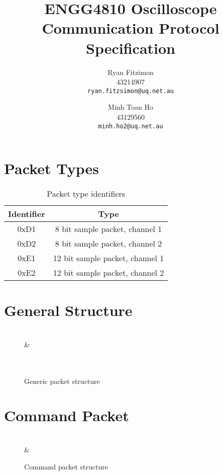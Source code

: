 \documentclass[]{article}
\title{ENGG4810 Oscilloscope Communication Protocol Specification}
\author{
	Ryan Fitzimon\\
	43214907\\
	\texttt{ryan.fitzsimon@uq.net.au}
	\and
	Minh Toan Ho\\
	43129560\\
	\texttt{minh.ho2@uq.net.au}
}
\begin{document}
\maketitle

\section{Packet Types}
\begin{table}[H]
	\centering
	\begin{tabular}{|c|c|}
		\hline
		\textbf{Identifier} & \textbf{Type} \\ \hline
		0xD1 & 8 bit sample packet, channel 1 \\ \hline
		0xD2 & 8 bit sample packet, channel 2 \\ \hline
		0xE1 & 12 bit sample packet, channel 1 \\ \hline
		0xE2 & 12 bit sample packet, channel 2 \\ \hline
	\end{tabular}
	\caption{Packet type identifiers}
\end{table}

\section{General Structure}
\begin{figure}[H]
	\centering
	\begin{bytefield}[bitwidth=2em]{16}
		 \\
		 &  \\
		 \\
		 \\
	\end{bytefield}
	\caption{Generic packet structure}
\end{figure}

\section{Command Packet}
\begin{figure}[H]
	\centering
	\begin{bytefield}[bitwidth=2em]{16}
		 \\
		 & 
	\end{bytefield}
	\caption{Command packet structure}
\end{figure}
\end{document}
